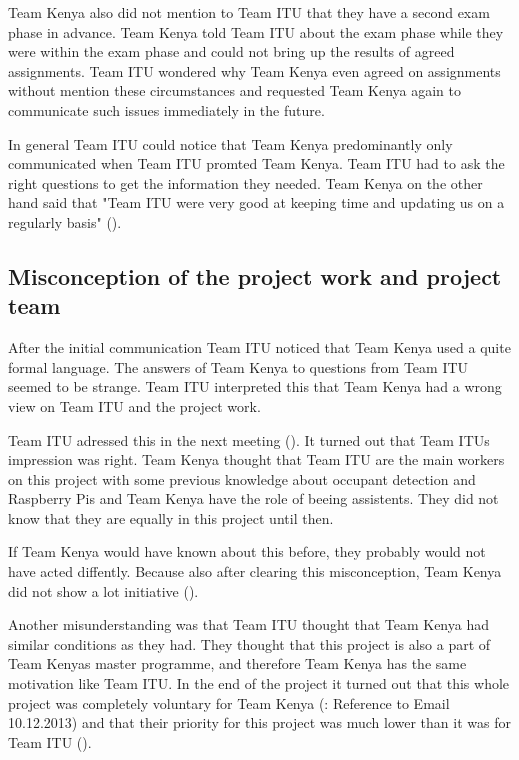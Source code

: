 Team Kenya also did not mention to Team ITU that they have a second exam phase in advance. Team Kenya told Team ITU about the exam phase while they were within the exam phase and could not bring up the results of agreed assignments. Team ITU wondered why Team Kenya even agreed on assignments without mention these circumstances and requested Team Kenya again to communicate such issues immediately in the future.

In general Team ITU could notice that Team Kenya predominantly only communicated when Team ITU promted Team Kenya. Team ITU had to ask the right questions to get the information they needed.
Team Kenya on the other hand said that "Team ITU were very good at keeping time and updating us on a regularly basis" ().


\subsection{Misconception of the project work and project team}
After the initial communication Team ITU noticed that Team Kenya used a quite formal language. The answers of Team Kenya to questions from Team ITU seemed to be strange. Team ITU interpreted this that Team Kenya had a wrong view on Team ITU and the project work.

Team ITU adressed this in the next meeting (). It turned out that Team ITUs impression was right. Team Kenya thought that Team ITU are the main workers on this project with some previous knowledge about occupant detection and Raspberry Pis and Team Kenya have the role of beeing assistents. They did not know that they are equally in this project until then.

If Team Kenya would have known about this before, they probably would not have acted diffently. Because also after clearing this misconception, Team Kenya did not show a lot initiative ().

Another misunderstanding was that Team ITU thought that Team Kenya had similar conditions as they had. They thought that this project is also a part of Team Kenyas master programme, and therefore Team Kenya has the same motivation like Team ITU.
In the end of the project it turned out that this whole project was completely voluntary for Team Kenya (\todo: Reference to Email 10.12.2013) and that their priority for this project was much lower than it was for Team ITU ().

